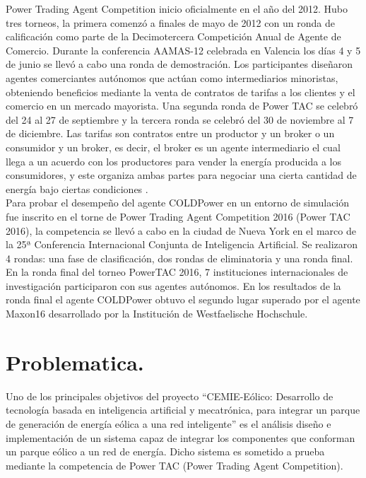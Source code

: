 Power Trading Agent Competition inicio oficialmente en el año del 2012. Hubo tres torneos, la primera comenzó a finales de mayo de 2012 con un ronda de calificación  como parte de la  Decimotercera Competición Anual de Agente de Comercio. Durante la conferencia AAMAS-12 celebrada en Valencia los días 4 y 5 de junio se llevó a cabo una ronda de demostración. Los participantes diseñaron agentes comerciantes autónomos que actúan como intermediarios minoristas, obteniendo beneficios mediante la venta de contratos de tarifas a los clientes y el comercio en un mercado mayorista. Una segunda ronda de Power TAC se celebró del 24 al 27 de septiembre y la tercera ronda se celebró del 30 de noviembre al 7 de diciembre.
Las tarifas son contratos entre un productor y un broker o un consumidor y un broker, es decir, el broker es un agente intermediario el cual llega a un acuerdo con los productores para vender la energía producida a los consumidores, y este organiza ambas partes para negociar una cierta cantidad de energía bajo ciertas condiciones \cite{MPAlonsoAYRGonzalezDesarrolloDeTec}.\\

Para probar el desempeño del agente COLDPower en un entorno de simulación fue inscrito en el torne de Power Trading Agent Competition 2016 (Power TAC 2016), la competencia se llevó a cabo en la ciudad de Nueva York en el marco de la 25ª Conferencia Internacional Conjunta de Inteligencia Artificial. Se realizaron 4 rondas: una fase de clasificación, dos rondas de eliminatoria y una ronda final. En la ronda final del torneo PowerTAC 2016, 7 instituciones internacionales de investigación participaron con sus agentes autónomos. En los resultados de la ronda final el agente COLDPower obtuvo el segundo lugar superado por el agente Maxon16 desarrollado por la Institución de Westfaelische Hochschule.

\section{Problematica.}
Uno de los principales objetivos del proyecto “CEMIE-Eólico: Desarrollo de tecnología basada en inteligencia artificial y mecatrónica, para integrar un parque de generación de energía eólica a una red inteligente” es el análisis diseño e implementación de un sistema capaz de integrar los componentes que conforman un parque eólico a un red de energía. Dicho sistema es sometido a prueba mediante la competencia de Power TAC (Power Trading Agent Competition).
\\

